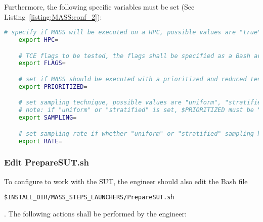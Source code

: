 Furthermore, the following specific \MASS variables must be set (See Listing~\ref{listing:MASS:conf_2}):

\begin{lstlisting}[language=bash, label=listing:MASS:conf_2, caption=\MASS specific variables. Excerpt of mass\_conf.sh file.]
	# specify if MASS will be executed on a HPC, possible values are "true" or "false"
	export HPC=

	# TCE flags to be tested, the flags shall be specified as a Bash array, e.g., ("-O0" "-O1").
	export FLAGS=

	# set if MASS should be executed with a prioritized and reduced test suite, possible values are "true" or "false"
	export PRIORITIZED=

	# set sampling technique, possible values are "uniform", "stratified", and "fsci"
	# note: if "uniform" or "stratified" is set, $PRIORITIZED must be "false"
	export SAMPLING=

	# set sampling rate if whether "uniform" or "stratified" sampling has been selected
	export RATE=
\end{lstlisting}

\subsubsection{Edit PrepareSUT.sh}


To configure \MASS to work with the SUT, the engineer should also edit the Bash file \\\begin{small}\texttt{\$INSTALL\_DIR/MASS\_STEPS\_LAUNCHERS/PrepareSUT.sh}\end{small}. The following actions shall be performed by the engineer:

